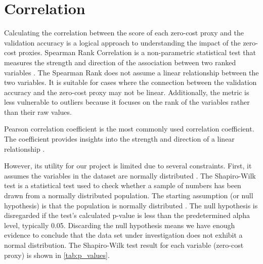 \section{Correlation}\label{sec:corr}

Calculating the correlation between the score of each zero-cost proxy and the validation accuracy is a logical approach to understanding the impact of the zero-cost proxies. Spearman Rank Correlation is a non-parametric statistical test that measures the strength and direction of the association between two ranked variables \autocite{hauke2011comparison}. The Spearman Rank does not assume a linear relationship between the two variables. It is suitable for cases where the connection between the validation accuracy and the zero-cost proxy may not be linear. Additionally, the metric is less vulnerable to outliers because it focuses on the rank of the variables rather than their raw values.

Pearson correlation coefficient is the most commonly used correlation coefficient. The coefficient provides insights into the strength and direction of a linear relationship \autocite{turney2022pearson}. 

However, its utility for our project is limited due to several constraints. First, it assumes the variables in the dataset are normally distributed \autocite{turney2022pearson}. The Shapiro-Wilk test is a statistical test used to check whether a sample of numbers has been drawn from a normally distributed population. The starting assumption (or null hypothesis) is that the population is normally distributed \autocite{shaphiro1965analysis}. The null hypothesis is disregarded if the test's calculated p-value is less than the predetermined alpha level, typically 0.05. Discarding the null hypothesis means we have enough evidence to conclude that the data set under investigation does not exhibit a normal distribution. The Shapiro-Wilk test result for each variable (zero-cost proxy) is shown in \cref{tab:p_values}. 

